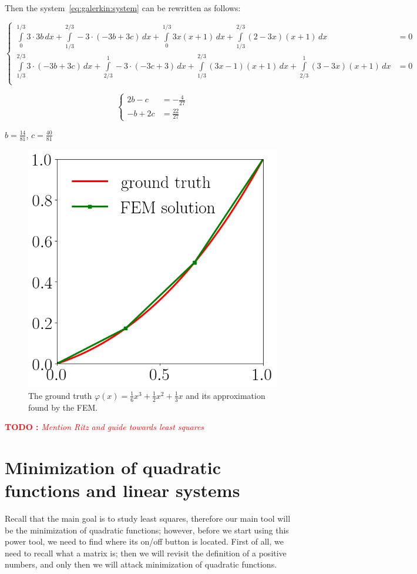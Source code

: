 \documentclass[notitlepage,oneside]{book}
\makeatletter
\newcommand{\authoredby}[1]{\addtocontents{toc}{\protect\@nameuse{authoredby#1}}}%
\newcommand\TODO[1]{\textcolor{red}{{\bf TODO :} \it #1}}
\makeatother
\begin{document}
Then the system~\eqref{eq:galerkin:system} can be rewritten as follows:

$$
\left\{
\begin{split}
\int\limits_{0}^{1/3} 3\cdot 3b\,dx + \int\limits_{1/3}^{2/3} -3\cdot (-3b+3c)\, dx + \int\limits_{0}^{1/3} 3x(x+1)\,dx + \int\limits_{1/3}^{2/3}(2-3x)(x+1)\,dx &= 0\\
\int\limits_{1/3}^{2/3} 3\cdot (-3b+3c)\,dx + \int\limits_{2/3}^{1} -3\cdot (-3c+3)\, dx + \int\limits_{1/3}^{2/3} (3x-1)(x+1)\,dx + \int\limits_{2/3}^{1}(3-3x)(x+1)\,dx &= 0\\
\end{split}
\right.
$$

$$
\left\{
\begin{split}
2b - c &= -\frac{4}{27}\\
-b + 2c &= \frac{22}{27}
\end{split}
\right.
$$

$b=\frac{14}{81}$, $c=\frac{40}{81}$
\begin{figure}[ht]
	\centering
	\includegraphics[width=.3\linewidth]{fem}
	\caption{The ground truth $\varphi(x) = \frac{1}{6} x^3 + \frac{1}{2} x^2 + \frac{1}{3} x$ and its approximation found by the FEM.}
	\label{fig:fem}
\end{figure}

\TODO{Mention Ritz and guide towards least squares}





\authoredby{B}
\chapter{Minimization of quadratic functions and linear systems}
\fancyhead[R]{\textcolor{green}{core text}}
\label{sec:mineqlin}

Recall that the main goal is to study least squares, therefore our main tool will be the minimization of quadratic functions;
however, before we start using this power tool, we need to find where its on/off button is located.
First of all, we need to recall what a matrix is; then we will revisit the definition of a positive numbers, and only then we will attack minimization of quadratic functions.
\end{document}
